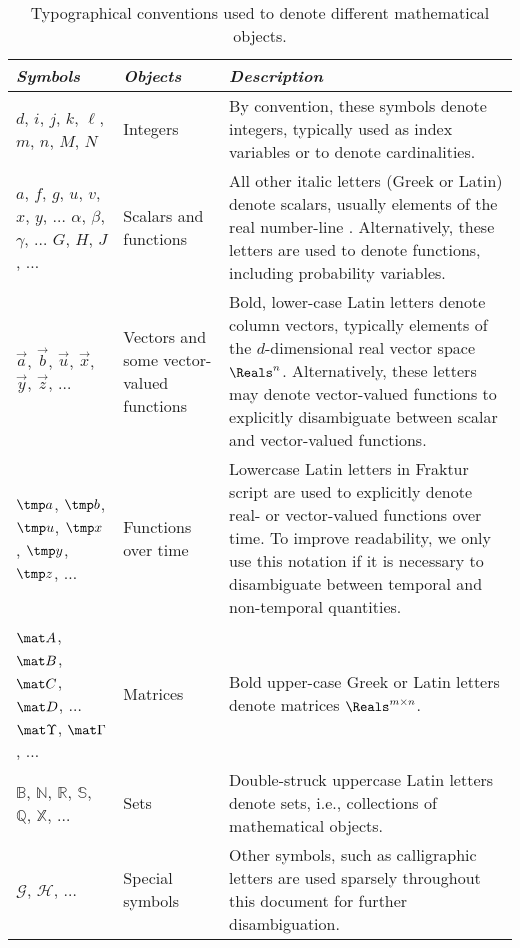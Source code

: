 \begin{table}
\centering
\caption{Typographical conventions used to denote different mathematical objects.}
\label{tbl:typography}
\small
\begin{tabular}{p{4cm} p{3cm} p{7.5cm}}
	\toprule
	\emph{Symbols} & \emph{Objects} & \emph{Description} \\
	\midrule
	$d$, $i$, $j$, $k$, $\ell$, $m$, $n$, $M$, $N$ & Integers & By convention, these symbols denote integers, typically used as index variables or to denote cardinalities. \\
	\midrule
	$a$, $f$, $g$, $u$, $v$, $x$, $y$, $\ldots$ \newline $\alpha$, $\beta$, $\gamma$, $\ldots$ \newline $G$, $H$, $J$, $\ldots$ & \raggedright Scalars and functions & All other italic letters (Greek or Latin) denote scalars, usually elements of the real number-line \Reals. Alternatively, these letters are used to denote functions, including probability variables.\\
	\midrule
	$\vec a$, $\vec b$, $\vec u$, $\vec x$, $\vec y$, $\vec z$, $\ldots$ & \raggedright Vectors and some vector\--valued functions & Bold, lower-case Latin letters denote column vectors, typically elements of the $d$-dimensional real vector space $\Reals^{n}$. Alternatively, these letters may denote vector-valued functions to explicitly disambiguate between scalar and vector-valued functions.\\
	\midrule
	$\tmp a$, $\tmp b$, $\tmp u$, $\tmp x$, $\tmp y$, $\tmp z$, $\ldots$ & \raggedright Functions over time & Lowercase Latin letters in Fraktur script are used to explicitly denote real- or vector-valued functions over time.
	To improve readability, we only use this notation if it is necessary to disambiguate between temporal and non-temporal quantities.\\
	\midrule
	$\mat A$, $\mat B$, $\mat C$, $\mat D$, $\ldots$ \newline
	$\mat \Upsilon$, $\mat \Gamma$, $\ldots$ & Matrices & Bold upper-case Greek or Latin letters denote matrices $\Reals^{m \times n}$. \\
	\midrule
	$\mathbb{B}$, $\mathbb{N}$, $\mathbb{R}$, $\mathbb{S}$, $\mathbb{Q}$, $\mathbb{X}$, $\ldots$ & Sets & Double-struck uppercase Latin letters denote sets, i.e., collections of mathematical objects. \\
	\midrule
	$\mathcal{G}$, $\mathcal{H}$, $\ldots$ & Special symbols & Other symbols, such as calligraphic letters are used sparsely throughout this document for further disambiguation.\\ 
	\bottomrule
\end{tabular}
\end{table}

